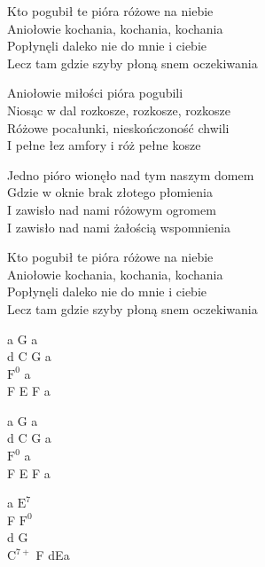 \begin{text}
    Kto pogubił te pióra różowe na niebie\\
    Aniołowie kochania, kochania, kochania\\
    Popłynęli daleko nie do mnie i ciebie\\
    Lecz tam gdzie szyby płoną snem oczekiwania

    Aniołowie miłości pióra pogubili\\
    Niosąc w dal rozkosze, rozkosze, rozkosze\\
    Różowe pocałunki, nieskończoność chwili\\
    I pełne łez amfory i róż pełne kosze

    Jedno pióro wionęło nad tym naszym domem\\
    Gdzie w oknie brak złotego płomienia\\
    I zawisło nad nami różowym ogromem\\
    I zawisło nad nami żałością wspomnienia

    Kto pogubił te pióra różowe na niebie\\
    Aniołowie kochania, kochania, kochania\\
    Popłynęli daleko nie do mnie i ciebie\\
    Lecz tam gdzie szyby płoną snem oczekiwania
\end{text}
\begin{chord}
    a G a\\
    d C G a\\
    $\mathrm{F^{0}}$ a\\
    F E F a

    a G a\\
    d C G a\\
    $\mathrm{F^{0}}$ a\\
    F E F a

    a $\mathrm{E^{7}}$\\
    F $\mathrm{F^{0}}$\\
    d G\\
    $\mathrm{C^{7+}}$ F dEa
\end{chord}
